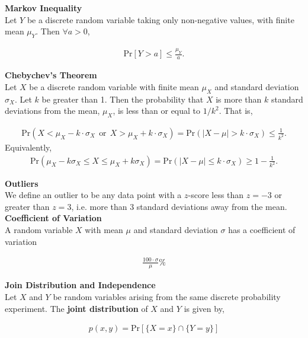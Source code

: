 \documentclass{article}
\numberwithin{theorem}{subsection}
\numberwithin{theorem}{subsubsection}
\theoremstyle{definition}
\numberwithin{definition}{subsection}
\numberwithin{definition}{subsubsection}
\begin{document}
\noindent \textbf{Markov Inequality} \\
\indent Let $Y$ be a discrete random variable taking only non-negative values, with finite mean $\mu_{Y}$. Then $\forall a > 0$,

\begin{gather*}
    \text{Pr}[Y>a] \leq \frac{\mu_{Y}}{a}.
\end{gather*}

\noindent \textbf{Chebychev's Theorem}\\
Let $X$ be a discrete random variable with finite mean $\mu_{X}$ and standard deviation $\sigma_{X}$. Let $k$ be greater than 1. Then the probability that $X$ is more than $k$ standard deviations from the mean, $\mu_{X}$, is less than or equal to $1/k^2$. That is,

\begin{gather*}
    \text{Pr}(X < \mu_{X} - k\cdot \sigma_{X} \ \ \text{or} \ \ X > \mu_{X} + k\cdot \sigma_{X}) =  \text{Pr}(\lvert X - \mu \rvert > k \cdot \sigma_{X}) \leq \frac{1}{k^2}.
\end{gather*}
\noindent Equivalently,
\begin{gather*}
    \text{Pr}(\mu_{X} - k\sigma_{X} \leq X \leq \mu_{X} + k\sigma_{X}) = \text{Pr}(\lvert X - \mu \rvert \leq k \cdot \sigma_{X}) \geq 1 - \frac{1}{k^2}.
\end{gather*}

\noindent \textbf{Outliers} \\
\indent We define an outlier to be any data point with a $z$-score less than $z = -3$ or greater than $z = 3$, i.e. more than 3 standard deviations away from the mean.\\

\noindent \textbf{Coefficient of Variation} \\
\indent A random variable $X$ with mean $\mu$ and standard deviation $\sigma$ has a coefficient of variation

\begin{gather*}
    \frac{100 \cdot \sigma}{\mu}\%
\end{gather*}

\noindent \textbf{Join Distribution and Independence} \\
\indent Let $X$ and $Y$ be random variables arising from the same discrete probability experiment. The \textbf{joint distribution} of $X$ and $Y$ is given by,

\begin{gather*}
    p(x,y) = \text{Pr}[\{X = x\} \cap \{Y = y\}]
\end{gather*}
\end{document}
